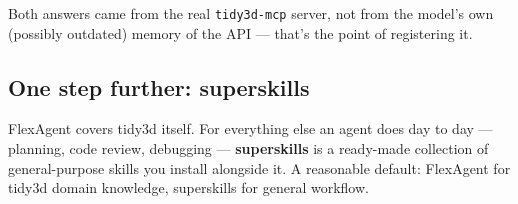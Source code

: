 \documentclass[11pt]{article}
\begin{document}
    Both answers came from the real \texttt{tidy3d-mcp} server, not from the
model's own (possibly outdated) memory of the API --- that's the point
of registering it.

    \subsection{One step further:
superskills}\label{one-step-further-superskills}

FlexAgent covers tidy3d itself. For everything else an agent does day to
day --- planning, code review, debugging --- \textbf{superskills} is a
ready-made collection of general-purpose skills you install alongside
it. A reasonable default: FlexAgent for tidy3d domain knowledge,
superskills for general workflow.


    
    
    
\end{document}
